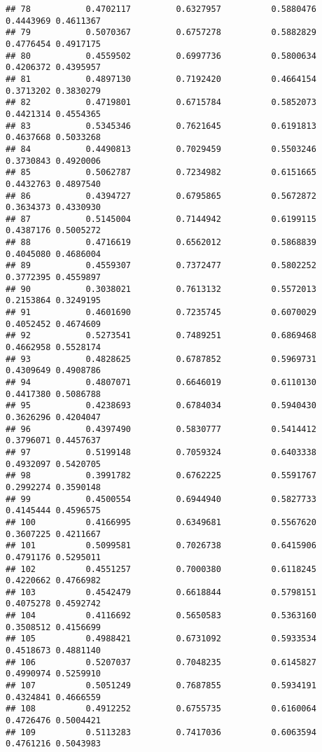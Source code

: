 \documentclass[]{article}
\begin{document}
\begin{verbatim}
## 78           0.4702117         0.6327957          0.5880476 0.4443969 0.4611367
## 79           0.5070367         0.6757278          0.5882829 0.4776454 0.4917175
## 80           0.4559502         0.6997736          0.5800634 0.4206372 0.4395957
## 81           0.4897130         0.7192420          0.4664154 0.3713202 0.3830279
## 82           0.4719801         0.6715784          0.5852073 0.4421314 0.4554365
## 83           0.5345346         0.7621645          0.6191813 0.4637668 0.5033268
## 84           0.4490813         0.7029459          0.5503246 0.3730843 0.4920006
## 85           0.5062787         0.7234982          0.6151665 0.4432763 0.4897540
## 86           0.4394727         0.6795865          0.5672872 0.3634373 0.4330930
## 87           0.5145004         0.7144942          0.6199115 0.4387176 0.5005272
## 88           0.4716619         0.6562012          0.5868839 0.4045080 0.4686004
## 89           0.4559307         0.7372477          0.5802252 0.3772395 0.4559897
## 90           0.3038021         0.7613132          0.5572013 0.2153864 0.3249195
## 91           0.4601690         0.7235745          0.6070029 0.4052452 0.4674609
## 92           0.5273541         0.7489251          0.6869468 0.4662958 0.5528174
## 93           0.4828625         0.6787852          0.5969731 0.4309649 0.4908786
## 94           0.4807071         0.6646019          0.6110130 0.4417380 0.5086788
## 95           0.4238693         0.6784034          0.5940430 0.3626296 0.4204047
## 96           0.4397490         0.5830777          0.5414412 0.3796071 0.4457637
## 97           0.5199148         0.7059324          0.6403338 0.4932097 0.5420705
## 98           0.3991782         0.6762225          0.5591767 0.2992274 0.3590148
## 99           0.4500554         0.6944940          0.5827733 0.4145444 0.4596575
## 100          0.4166995         0.6349681          0.5567620 0.3607225 0.4211667
## 101          0.5099581         0.7026738          0.6415906 0.4791176 0.5295011
## 102          0.4551257         0.7000380          0.6118245 0.4220662 0.4766982
## 103          0.4542479         0.6618844          0.5798151 0.4075278 0.4592742
## 104          0.4116692         0.5650583          0.5363160 0.3508512 0.4156699
## 105          0.4988421         0.6731092          0.5933534 0.4518673 0.4881140
## 106          0.5207037         0.7048235          0.6145827 0.4990974 0.5259910
## 107          0.5051249         0.7687855          0.5934191 0.4324841 0.4666559
## 108          0.4912252         0.6755735          0.6160064 0.4726476 0.5004421
## 109          0.5113283         0.7417036          0.6063594 0.4761216 0.5043983

\end{verbatim}
\end{document}

